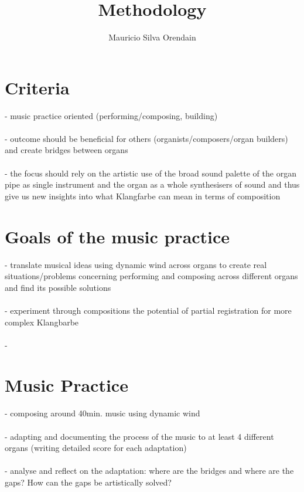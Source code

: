 \documentclass[11pt, oneside]{article}   	%
\title{Methodology}
\author{Mauricio Silva Orendain}
\begin{document}
\maketitle
\section{Criteria}

- music practice oriented (performing/composing, building)\\
\\
- outcome should be beneficial for others (organists/composers/organ builders) and create bridges between organs\\
\\
- the focus should rely on the artistic use of the broad sound palette of the organ pipe as single instrument and the organ as a whole synthesisers of sound and thus give us new insights into what Klangfarbe can mean in terms of composition \\
\section{Goals of the music practice}

- translate musical ideas using dynamic wind across organs to create real situations/problems concerning performing and composing across different organs and find its possible solutions\\
\\
- experiment through compositions the potential of partial registration for more complex Klangbarbe\\
\\
- 
\section{Music Practice}

- composing around 40min. music using dynamic wind\\
\\
- adapting and documenting the process of the music to at least 4 different organs (writing detailed score for each adaptation)\\
\\
- analyse and reflect on the adaptation: where are the bridges and where are the gaps? How can the gaps be artistically solved?

\end{document}
